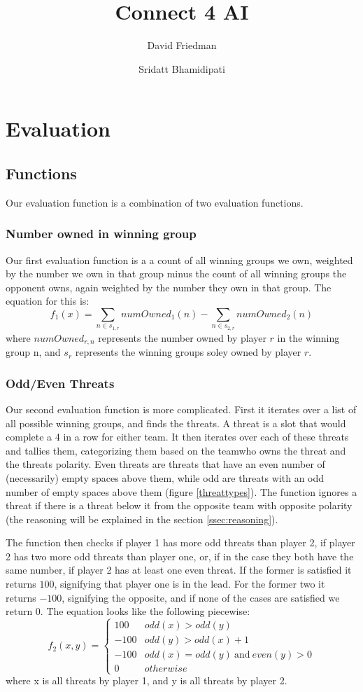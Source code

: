 \documentclass{article}
\title{Connect 4 AI}
\author{David Friedman \and Sridatt Bhamidipati}
\begin{document}
	\maketitle
	\newpage
	\tableofcontents
	\newpage
	
	\section{Evaluation}
		\subsection{Functions}
		Our evaluation function is a combination of two evaluation functions.
		\subsubsection{Number owned in winning group}
		Our first evaluation function is a a count of all winning groups we own, weighted by the number we own in that group minus the count of all winning groups the opponent owns, again weighted by the number they own in that group. The equation for this is:
		\[f_1(x)=\sum_{n \in s_{1,r}}{numOwned_1(n)}-\sum_{n \in s_{2,r}}{numOwned_2(n)}\]
		where $numOwned_{r,n}$ represents the number owned by player $r$ in the winning group n, and $s_r$ represents the winning groups soley owned by player $r$.
		\subsubsection{Odd/Even Threats}
		Our second evaluation function is more complicated. First it iterates over a list of all possible winning groups, and finds the threats. A threat is a slot that would complete a 4 in a row for either team. It then iterates over each of these threats and tallies them, categorizing them based on the teamwho owns the threat and the threats polarity. Even threats are threats that have an even number of (necessarily) empty spaces above them, while odd are threats with an odd number of empty spaces above them (figure \ref{threattypes}). The function ignores a threat if there is a threat below it from the opposite team with opposite polarity (the reasoning will be explained in the section \ref{ssec:reasoning}). 
		
		The function then checks if player 1 has more odd threats than player 2, if player 2 has two more odd threats than player one, or, if in the case they both have the same number, if player 2 has at least one even threat. If the former is satisfied it returns $100$, signifying that player one is in the lead. For the former two it returns $-100$, signifying the opposite, and if none of the cases are satisfied we return 0. The equation looks like the following piecewise:
		\[ f_2(x,y)=\begin{cases} 
		      100 & odd(x)>odd(y) \\
		     -100 & odd(y)>odd(x)+1 \\
		     -100 & odd(x)=odd(y)~\mbox{and}~even(y) > 0\\
		      0 & otherwise
		   \end{cases}
		\]
where x is all threats by player 1, and y is all threats by player 2.
		
\end{document}
